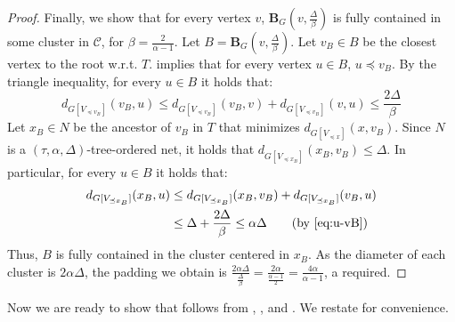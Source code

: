 \documentclass{article}
\def\ball{\mathbf{B}}
\begin{document}
\begin{proof}
	Finally, we show that for every vertex $v$, $\ball_G(v,\frac\Delta\beta)$ is fully contained in some cluster in $\mathcal{C}$, for $\beta=\frac{2}{\alpha-1}$. Let $B=\ball_G(v,\frac{\Delta}{\beta})$.	Let $v_B\in B$ be the closest vertex to the root w.r.t. $T$.  implies that for every vertex $u\in B$,  $u\preceq v_B$. By the triangle inequality, for every $u\in B$ it holds that:
	\begin{equation}\label{eq:u-vB}
		d_{G[V_{\preceq v_B}]}(v_B,u)\le d_{G[V_{\preceq v_B}]}(v_B,v)+d_{G[V_{\preceq v_B}]}(v,u)\le\frac{2\Delta}{\beta}
	\end{equation}
	Let $x_B\in N$ be the ancestor of $v_B$ in $T$ that minimizes $d_{G[V_{\preceq x}]}(x,v_B)$. Since $N$ is a $(\tau,\alpha,\Delta)$-tree-ordered net, it holds that $d_{G[V_{\preceq x_B}]}(x_B,v_B)\le\Delta$. In particular, for every $u\in B$ it holds that:
	\begin{equation*}
		\begin{split}
			d_{G[V_{\preceq x_B}]}(x_B,u) &\le d_{G[V_{\preceq x_B}]}(x_B,v_B)+d_{G[V_{\preceq x_B}]}(v_B,u)\\
			&\le\Delta+\frac{2\Delta}{\beta}\le\alpha\Delta    \qquad \mbox{(by \cref{eq:u-vB})}         
		\end{split}
	\end{equation*}
	Thus, $B$ is fully contained in the cluster centered in $x_B$.
	As the diameter of each cluster is $2\alpha\Delta$, the padding we obtain is $\frac{2\alpha\Delta}{\frac{\Delta}{\beta}}=\frac{2\alpha}{\frac{\alpha-1}{2}}=\frac{4\alpha}{\alpha-1}$, 
	a required.
\end{proof}

Now we are ready to show that  follows from , , and . We restate  for convenience.
\end{document}
